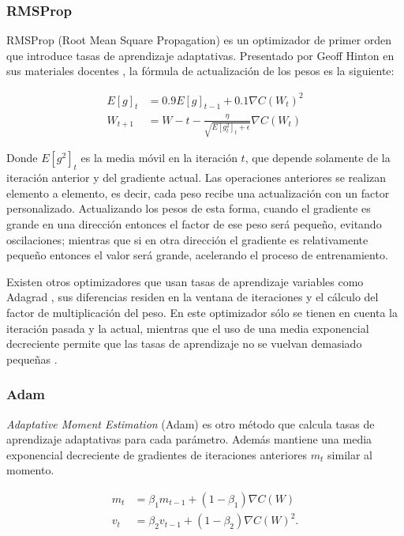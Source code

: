 \subsubsection{RMSProp}

RMSProp (Root Mean Square Propagation) es un optimizador de primer orden que introduce tasas de aprendizaje adaptativas. Presentado por Geoff Hinton en sus materiales docentes \cite{rmsprop}, la fórmula de actualización de los pesos es la siguiente:

\begin{align*}
	E[g]_t &= 0.9 E[g]_{t-1} + 0.1 \nabla C(W_t)^{2}\\
	W_{t+1} &= W-t - \frac{\eta}{\sqrt{E[g_t^2]_t + \epsilon}}\nabla C(W_t)
\end{align*}

Donde $E[g^2]_t$ es la media móvil en la iteración $t$, que depende solamente de la iteración anterior y del gradiente actual. Las operaciones anteriores se realizan elemento a elemento, es decir, cada peso recibe una actualización con un factor personalizado. Actualizando los pesos de esta forma, cuando el gradiente es grande en una dirección entonces el factor de ese peso será pequeño, evitando oscilaciones; mientras que si en otra dirección el gradiente es relativamente pequeño entonces el valor será grande, acelerando el proceso de entrenamiento.

Existen otros optimizadores que usan tasas de aprendizaje variables como Adagrad \cite{adagrad}, sus diferencias residen en la ventana de iteraciones y el cálculo del factor de multiplicación del peso. En este optimizador sólo se tienen en cuenta la iteración pasada y la actual, mientras que el uso de una media exponencial decreciente permite que las tasas de aprendizaje no se vuelvan demasiado pequeñas \cite{divedeeplearning, GoodFellowBook}.

\subsubsection{Adam}

\textit{Adaptative Moment Estimation} (Adam) \cite{Adam} es otro método que calcula tasas de aprendizaje adaptativas para cada parámetro. Además mantiene una media exponencial decreciente de gradientes de iteraciones anteriores $m_t$ similar al momento.

\begin{align*}
	m_t&= \beta_1 m_{t-1} + (1-\beta_1)\nabla C(W) \\
	v_t&= \beta_2 v_{t-1} + (1-\beta_2)\nabla C(W)^2.
\end{align*}

